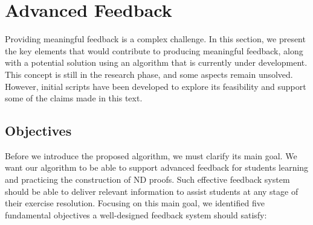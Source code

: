 %

\chapter{Advanced Feedback}
\label{chap:algo}

Providing meaningful feedback is a complex challenge. In this section, we present the key elements that would contribute to producing meaningful feedback, along with a potential solution using an algorithm that is currently under development. This concept is still in the research phase, and some aspects remain unsolved. However, initial scripts have been developed to explore its feasibility and support some of the claims made in this text. 

\section{Objectives}
Before we introduce the proposed algorithm, we must clarify its main goal. We want our algorithm to be able to support advanced feedback for students learning and practicing the construction of \gls{ND} proofs. Such effective feedback system should be able to deliver relevant information to assist students at any stage of their exercise resolution. Focusing on this main goal, we identified five fundamental objectives a well-designed feedback system should satisfy:

